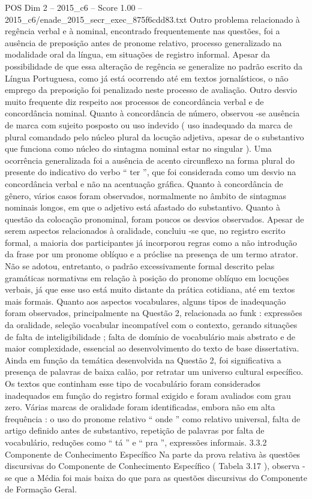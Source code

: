 \begin{textsample}{POS Dim 2 – 2015\_c6 – Score 1.00 – 2015\_c6/enade\_2015\_secr\_exec\_875f6cdd83.txt}
Outro problema relacionado à regência verbal e à nominal, encontrado frequentemente nas questões, foi a ausência de preposição antes de pronome relativo, processo generalizado na modalidade oral da língua, em situações de registro informal.
Apesar da possibilidade de que essa alteração de regência se generalize no padrão escrito da Língua Portuguesa, como já está ocorrendo até em textos jornalísticos, o não emprego da preposição foi penalizado neste processo de avaliação.
Outro desvio muito frequente diz respeito aos processos de concordância verbal e de concordância nominal.
Quanto à concordância de número, observou -se ausência de marca com sujeito posposto ou uso indevido ( uso inadequado da marca de plural comandado pelo núcleo plural da locução adjetiva, apesar de o substantivo que funciona como núcleo do sintagma nominal estar no singular ).
Uma ocorrência generalizada foi a ausência de acento circunflexo na forma plural do presente do indicativo do verbo “ ter ”, que foi considerada como um desvio na concordância verbal e não na acentuação gráfica.
Quanto à concordância de gênero, vários casos foram observados, normalmente no âmbito de sintagmas nominais longos, em que o adjetivo está afastado do substantivo.
Quanto à questão da colocação pronominal, foram poucos os desvios observados.
Apesar de serem aspectos relacionados à oralidade, concluiu -se que, no registro escrito formal, a maioria dos participantes já incorporou regras como a não introdução da frase por um pronome oblíquo e a próclise na presença de um termo atrator.
Não se adotou, entretanto, o padrão excessivamente formal descrito pelas gramáticas normativas em relação à posição do pronome oblíquo em locuções verbais, já que esse uso está muito distante da prática cotidiana, até em textos mais formais.
Quanto aos aspectos vocabulares, alguns tipos de inadequação foram observados, principalmente na Questão 2, relacionada ao funk : expressões da oralidade, seleção vocabular incompatível com o contexto, gerando situações de falta de inteligibilidade ; falta de domínio de vocabulário mais abstrato e de maior complexidade, essencial ao desenvolvimento do texto de base dissertativa.
Ainda em função da temática desenvolvida na Questão 2, foi significativa a presença de palavras de baixa calão, por retratar um universo cultural específico.
Os textos que continham esse tipo de vocabulário foram considerados inadequados em função do registro formal exigido e foram avaliados com grau zero.
Várias marcas de oralidade foram identificadas, embora não em alta frequência : o uso do pronome relativo “ onde ” como relativo universal, falta de artigo definido antes de substantivo, repetição de palavras por falta de vocabulário, reduções como “ tá ” e “ pra ”, expressões informais. 3.3.2 Componente de Conhecimento Específico Na parte da prova relativa às questões discursivas do Componente de Conhecimento Específico ( Tabela 3.17 ), observa -se que a Média foi mais baixa do que para as questões discursivas do Componente de Formação Geral.

\end{textsample}
